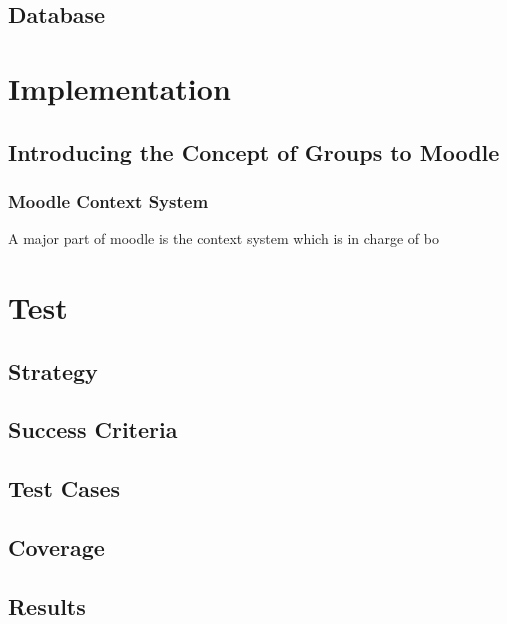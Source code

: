 		\section{Database}

	\chapter{Implementation}
		
		\section{Introducing the Concept of Groups to Moodle} %
		\subsection{Moodle Context System}
		A major part of moodle is the context system which is in charge of bo
		
		
		
	
	\chapter{Test}
		\section{Strategy}
		\section{Success Criteria}
		\section{Test Cases}
		\section{Coverage}
		\section{Results}
	
